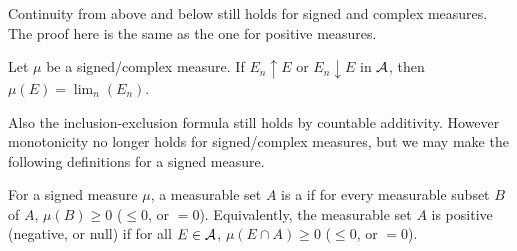 Continuity from above and below still holds for signed and complex measures. The proof here is the same as the one for positive measures.
\begin{xca}
    Let $\mu$ be a signed/complex measure. If $E_n \uparrow E$ or $E_n \downarrow E$ in $\mathcal{A}$, then $\mu(E) = \lim_n(E_n)$.
\end{xca}
Also the inclusion-exclusion formula still holds by countable additivity. However monotonicity no longer holds for signed/complex measures, but we may make the following definitions for a signed measure.

\begin{defn}
    For a signed measure $\mu$, a measurable set $A$ is a  if for every measurable subset $B$ of $A$, $\mu(B)\geq0$ ($\leq 0$, or $=0$). Equivalently, the measurable set $A$ is positive (negative, or null) if for all $E\in \mathcal{A}$, $\mu(E\cap A) \geq 0$ ($\leq 0$, or $= 0$).
\end{defn}

